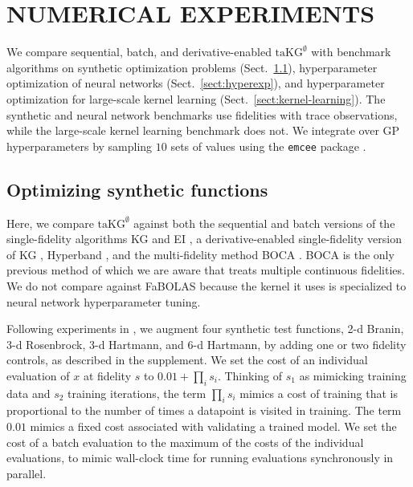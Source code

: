\documentclass[letterpaper]{article}
\newcommand{\taKGE}{\text{taKG}^\emptyset}
\numberwithin{equation}{section}
\newcommand{\sect}[1]{\ref{sect:#1}}
\begin{document}
\section{NUMERICAL EXPERIMENTS}
\label{sect:numerical}
We compare sequential, batch, and derivative-enabled $\taKGE$ with benchmark algorithms on synthetic optimization problems (Sect.~\sect{synthetic}), hyperparameter optimization of neural networks (Sect.~\sect{hyperexp}), and hyperparameter optimization for large-scale kernel learning (Sect.~\sect{kernel-learning}).  The synthetic and neural network benchmarks use fidelities with trace observations, while the large-scale kernel learning benchmark does not.  We integrate over GP hyperparameters by sampling $10$ sets of values using the \texttt{emcee} package \citep{foreman2013emcee}.


\subsection{Optimizing synthetic functions} \label{sect:synthetic}
Here, we compare $\taKGE$ against both the sequential and batch versions of the single-fidelity algorithms KG \citep{wu2016parallel} and EI \citep{jones1998efficient,wang2015parallel}, a derivative-enabled single-fidelity version of KG \citep{wu2017bayesian}, Hyperband \citep{li2016hyperband}, and the multi-fidelity method BOCA \citep{kandasamy2017multi}.  BOCA is the only previous method of which we are aware that treats multiple continuous fidelities.  We do not compare against FaBOLAS \citep{klein2016fast,klein2015towards} because the kernel it uses is specialized to neural network hyperparameter tuning.

Following experiments in \citet{kandasamy2017multi}, we augment four synthetic test functions, 2-d Branin, 3-d Rosenbrock, 3-d Hartmann, and 6-d Hartmann, by adding one or two fidelity controls, as described in the supplement.  
We set the cost of an individual evaluation of $x$ at fidelity $s$ to $0.01 + \prod_i s_i$.
Thinking of $s_1$ as mimicking training data and $s_2$ training iterations, 
the term $\prod_i s_i$ mimics a cost of training that is proportional to the number of times a datapoint is visited in training.  The term $0.01$ mimics a fixed cost associated with validating a trained model.
We set the cost of a batch evaluation to the maximum of the costs of the individual evaluations,
to mimic wall-clock time for running evaluations synchronously in parallel. 
\end{document}
